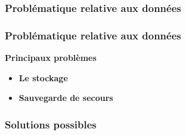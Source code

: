 \subsubsection[Problématique relative aux données]{Problématique relative aux données}
\begin{frame}
\frametitle{Problématique relative aux données}
\begin{block}{\textbf{Principaux problèmes}}
 \begin{itemize}
	\item \textbf{Le stockage}
	\item \textbf{Sauvegarde de secours}
\end{itemize}
\end{block}
\end{frame}

\subsubsection[Solutions possibles]{Solutions possibles}
